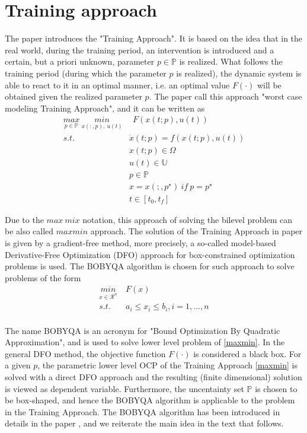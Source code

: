 \documentclass  [
  paper    = a4,
  BCOR     = 10mm,
  twoside,
  fontsize = 12pt,
  fleqn,
  toc      = bibnumbered,
  toc      = listofnumbered,
  numbers  = noendperiod,
  headings = normal,
  listof   = leveldown,
  version  = 3.03
]                                       {scrreprt}
\newcommand{\<}{\langle}
\renewcommand{\>}{\rangle}
\begin{document}
\section{Training approach}
The paper \cite{MatSch22} introduces the "Training Approach".  It is based on the idea that in the real world, during the training period, an intervention is introduced and a certain, but a priori unknown, parameter $p  \in   \mathbb{P}$ is realized. What follows the training period (during which the parameter $p$ is realized), the dynamic system is able to react to it in an optimal manner, i.e. an optimal value $ F(\cdot)$ will be obtained given the  realized parameter $p$. The paper \cite{MatSch22} call this approach "worst case modeling Training Approach", and it can be written as 
\begin{equation}
	\begin{aligned}
		\underset{p  \in   \mathbb{P}}{max} \ \underset{x(:,p), \  u(t)}{min} &  \ \ F(x(t;p), u(t))\\ 
	s.t.\ \  &  \dot{x} (t;p) = f(x(t;p), u(t))\\ 
& x(t;p) \in \Omega \\
& u(t) \in \mathbb{U}  \\
& p  \in   \mathbb{P}  \\
& x = x(;,p^\star) \ if \ p = p^\star \\
& t \in [t_0, t_f]
	\end{aligned}
	\label{maxmin}
\end{equation}

Due to the $max \ mix$ notation, this approach of solving the bilevel problem can be also called $max min$ approach. The solution of the Training Approach in paper \cite{MatSch22} is given by a gradient-free method, more precisely, a so-called model-based Derivative-Free Optimization (DFO) approach for box-constrained optimization problems is used. The BOBYQA algorithm is chosen for such approach to solve problems of the form
\begin{equation}
	\begin{aligned}
		\underset{x \in \mathcal{R}^n}{min} & \  F(x)  \\ 
		s.t.  & \ a_i \leq x_i \leq b_i, i = 1, ..., n \\
	\end{aligned}
	\label{DFO_bc}
\end{equation}

The name BOBYQA is an acronym for "Bound Optimization By Quadratic Approximation", and is used to solve lower level problem of \ref{maxmin}. In the general DFO method, the objective function $F(\cdot)$ is considered a black box. For a given $p$, the parametric lower level OCP of the Training Approach \ref{maxmin} is solved with a direct DFO approach and the resulting (finite dimensional) solution is viewed as dependent variable. Furthermore, the uncentainty set $\mathbb{P}$ is chosen to be box-shaped, and hence the BOBYQA algorithm is applicable to the problem in the Training Approach. The BOBYQA algorithm has been introduced in details in the paper \cite{MicPow09}, and we reiterate the main idea in the text that follows.  
\end{document}
